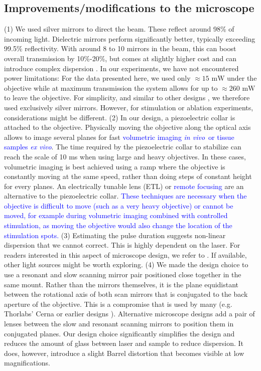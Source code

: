 \documentclass[10pt,letterpaper]{article}
\newcommand{\invivo}{\textit{in vivo}~}
\begin{document}
\subsection*{Improvements/modifications to the microscope}
(1) We used silver mirrors to direct the beam. These reflect around 98\% of incoming light. Dielectric mirrors perform significantly better, typically exceeding 99.5\% reflectivity. With around 8 to 10 mirrors in the beam, this can boost overall transmission by 10\%-20\%, but comes at slightly higher cost and can introduce complex dispersion \cite{Rupprecht2019}. In our experiments, we have not encountered power limitations: For the data presented here, we used only $\approx 15\text{ mW}$ under the objective while at maximum transmission the system allows for up to $\approx 260\text{ mW}$ to leave the objective. For simplicity, and similar to other designs \cite{Sofroniew2016}, we therefore used exclusively silver mirrors. However, for stimulation or ablation experiments, considerations might be different.\newline
(2) In our design, a piezoelectric collar is attached to the objective. Physically moving the objective along the optical axis allows to image several planes for fast \textcolor{blue}{volumetric imaging \invivo or tissue samples \textit{ex vivo}}. The time required by the piezoelectric collar to stabilize can reach the scale of 10 ms when using large and heavy objectives. In these cases, volumetric imaging is  best achieved using a ramp where the objective is constantly moving at the same speed, rather than doing steps of constant height for every planes. An electrically tunable lens (ETL) \cite{Chen2016} or \textcolor{blue}{remote focusing} \cite{Botcherby2007} are an alternative to the piezoelectric collar. \textcolor{blue}{These techniques are necessary when the objective is difficult to move (such as a very heavy objective) or cannot be moved, for example during volumetric imaging combined with controlled stimulation, as moving the objective would also change the location of the stimulation spots.}\newline
(3) Estimating the pulse duration suggests non-linear dispersion that we cannot correct. This is highly dependent on the laser. For readers interested in this aspect of microscope design, we refer to \cite{Saidi2023, Bueno2019}. If available, other light sources might be worth exploring.\newline
(4) We made the design choice to use a resonant and slow scanning mirror pair positioned close together in the same mount. Rather than the mirrors themselves, it is the plane equidistant between the rotational axis of both scan mirrors that is conjugated to the back aperture of the objective. This is a compromise that is used by many (e.g. Thorlabs' Cerna or earlier designs \cite{Rosenegger2014, Tan1999, Nguyen2001}). Alternative microscope designs add a pair of lenses between the slow and resonant scanning mirrors to position them in conjugated planes. Our design choice significantly simplifies the design and reduces the amount of glass between laser and sample to reduce dispersion. It does, however, introduce a slight Barrel distortion that becomes visible at low magnifications.\newline
\end{document}
